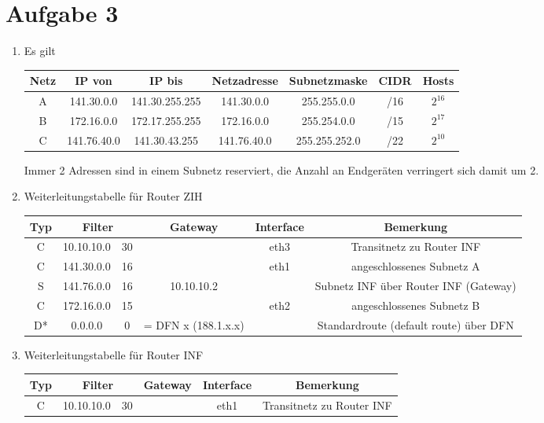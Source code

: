 \documentclass{article}
\begin{document}
	\section*{Aufgabe 3}
	\begin{enumerate}[label=(\alph*)]
		\item Es gilt
		\begin{center}
			\begin{tabular}{c|c|c|c|c|c|c}
				\textbf{Netz} & \textbf{IP von} & \textbf{IP bis} & \textbf{Netzadresse} & \textbf{Subnetzmaske} & \textbf{CIDR} & \textbf{Hosts} \\
				\hline
				A & 141.30.0.0 & 141.30.255.255 & 141.30.0.0 & 255.255.0.0 & /16 & $2^{16}$ \\
				B & 172.16.0.0 & 172.17.255.255 & 172.16.0.0 & 255.254.0.0 & /15 & $2^{17}$ \\
				C & 141.76.40.0 & 141.30.43.255 & 141.76.40.0 & 255.255.252.0 & /22 & $2^{10}$
			\end{tabular}
		\end{center}
		Immer 2 Adressen sind in einem Subnetz reserviert, die Anzahl an Endgeräten verringert sich damit um 2.
		\item Weiterleitungstabelle für Router ZIH
		\begin{center}
			\begin{tabular}{c|cc|c|c|c}
				\textbf{Typ} & \multicolumn{2}{c|}{\textbf{Filter}} & \textbf{Gateway} & \textbf{Interface} & \textbf{Bemerkung} \\
				\hline
				C & 10.10.10.0 & 30 & & eth3 & Transitnetz zu Router INF \\
				C & 141.30.0.0 & 16 & & eth1 & angeschlossenes Subnetz A \\
				S & 141.76.0.0 & 16 & 10.10.10.2 & & Subnetz INF über Router INF (Gateway) \\
				C & 172.16.0.0 & 15 & & eth2 & angeschlossenes Subnetz B \\
				D* & 0.0.0.0 & 0 & = DFN x (188.1.x.x) & & Standardroute (default route) über DFN
			\end{tabular}
		\end{center}
		\item Weiterleitungstabelle für Router INF
		\begin{center}
			\begin{tabular}{c|cc|c|c|c}
				\textbf{Typ} & \multicolumn{2}{c|}{\textbf{Filter}} & \textbf{Gateway} & \textbf{Interface} & \textbf{Bemerkung} \\
				\hline
				C & 10.10.10.0 & 30 & & eth1 & Transitnetz zu Router INF \\

\end{tabular}
\end{center}
\end{enumerate}
\end{document}
